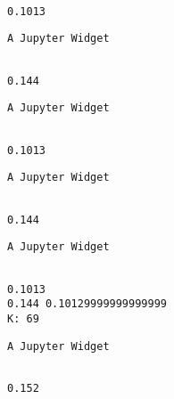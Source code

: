 \documentclass[11pt]{article}
\begin{document}
    
    \begin{Verbatim}[commandchars=\\\{\}]

0.1013

    \end{Verbatim}

    
    \begin{verbatim}
A Jupyter Widget
    \end{verbatim}

    
    \begin{Verbatim}[commandchars=\\\{\}]

0.144

    \end{Verbatim}

    
    \begin{verbatim}
A Jupyter Widget
    \end{verbatim}

    
    \begin{Verbatim}[commandchars=\\\{\}]

0.1013

    \end{Verbatim}

    
    \begin{verbatim}
A Jupyter Widget
    \end{verbatim}

    
    \begin{Verbatim}[commandchars=\\\{\}]

0.144

    \end{Verbatim}

    
    \begin{verbatim}
A Jupyter Widget
    \end{verbatim}

    
    \begin{Verbatim}[commandchars=\\\{\}]

0.1013
0.144 0.10129999999999999
K: 69

    \end{Verbatim}

    
    \begin{verbatim}
A Jupyter Widget
    \end{verbatim}

    
    \begin{Verbatim}[commandchars=\\\{\}]

0.152

    \end{Verbatim}
\end{document}
